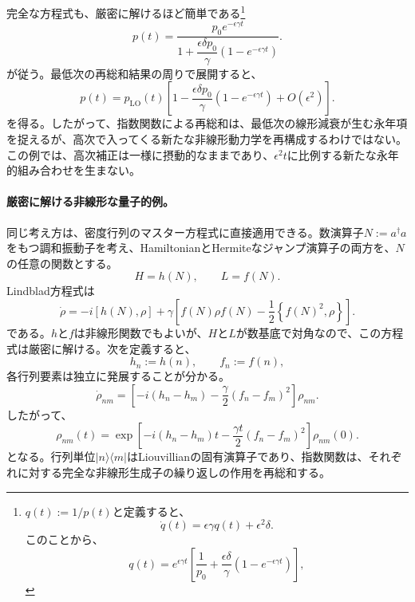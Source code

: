 \documentclass[a4paper,11pt,oneside]{article}
\theoremstyle{definition}
\numberwithin{equation}{section}
\begin{document}
完全な方程式も、厳密に解けるほど簡単である\footnote{\(q(t)
:= 1/p(t)\)と定義すると、
\begin{equation}
\dot q(t)
=
\epsilon\gamma q(t)
+
\epsilon^{2}\delta .
\end{equation}
このことから、
\begin{equation}
q(t)
=
e^{\epsilon\gamma t}
\left[
\frac{1}{p_{0}}
+
\frac{\epsilon\delta}{\gamma}
\left(
1-e^{-\epsilon\gamma t}
\right)
\right],
\end{equation}}
\begin{equation}
p(t)
=
\frac{
p_{0}e^{-\epsilon\gamma t}
}{
1+
\dfrac{\epsilon\delta p_{0}}{\gamma}
\left(
1-e^{-\epsilon\gamma t}
\right)
}.
\end{equation}
が従う。最低次の再総和結果の周りで展開すると、
\begin{equation}
p(t)
=
p_{\mathrm{LO}}(t)
\left[
1
-
\frac{\epsilon\delta p_{0}}{\gamma}
\left(
1-e^{-\epsilon\gamma t}
\right)
+
O(\epsilon^{2})
\right].
\end{equation}
を得る。したがって、指数関数による再総和は、最低次の線形減衰が生む永年項を捉えるが、高次で入ってくる新たな非線形動力学を再構成するわけではない。この例では、高次補正は一様に摂動的なままであり、$\epsilon^{2}t$に比例する新たな永年的組み合わせを生まない。





\paragraph{厳密に解ける非線形な量子的例。}
同じ考え方は、密度行列のマスター方程式に直接適用できる。数演算子\( N := a^{\dagger}a \)をもつ調和振動子を考え、HamiltonianとHermiteなジャンプ演算子の両方を、$N$の任意の関数とする。
\begin{equation}
H
=
h(N),
\qquad
L
=
f(N).
\end{equation}
Lindblad方程式は
\begin{equation}
\dot\rho
=
-i[h(N),\rho]
+
\gamma
\left[
f(N)\rho f(N)
-
\frac{1}{2}
\left\{
f(N)^{2},\rho
\right\}
\right].
\end{equation}
である。$h$と$f$は非線形関数でもよいが、$H$と$L$が数基底で対角なので、この方程式は厳密に解ける。次を定義すると、
\begin{equation}
h_{n}
:=
h(n),
\qquad
f_{n}
:=
f(n),
\end{equation}
各行列要素は独立に発展することが分かる。
\begin{equation}
\dot\rho_{nm}
=
\left[
-i\left(h_{n}-h_{m}\right)
-
\frac{\gamma}{2}
\left(f_{n}-f_{m}\right)^{2}
\right]
\rho_{nm}.
\end{equation}
したがって、
\begin{equation}
\rho_{nm}(t)
=
\exp\left[
-i\left(h_{n}-h_{m}\right)t
-
\frac{\gamma t}{2}
\left(f_{n}-f_{m}\right)^{2}
\right]
\rho_{nm}(0).
\end{equation}
となる。行列単位$|n\rangle\langle m|$はLiouvillianの固有演算子であり、指数関数は、それぞれに対する完全な非線形生成子の繰り返しの作用を再総和する。
\end{document}
